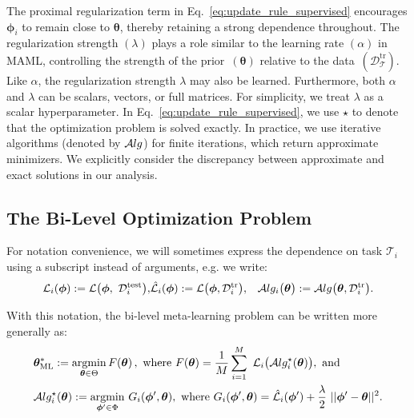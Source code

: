 \documentclass{article} \usepackage[nonatbib, final]{mod_neurips}
\newcommand{\task}{\mathcal{T}}
\newcommand{\data}{\mathcal{D}}
\DeclareMathOperator*{\argmin}{\mathrm{argmin}}
\newcommand{\param}{{\bm{\phi}}}               \newcommand{\paramspace}{\Phi}
\newcommand{\prior}{{\bm{\theta}}}               \newcommand{\priorspace}{\Theta}
\newcommand{\fn}{\mathcal{L}}                  \newcommand{\udfn}{\tilde{\fn}}        \newcommand{\fnht}{\hat{\fn}}        \newcommand{\ud}{\alg}
\newcommand{\algstar}{\mathcal{A}lg^\star}
\newcommand{\datatr}{\data^{\mathrm{tr}}}
\newcommand{\datatest}{\data^{\mathrm{test}}}\clearpage{}
\begin{document}
The proximal regularization term in Eq.~\ref{eq:update_rule_supervised} encourages $\param_i$ to remain close to $\prior$, thereby retaining a strong dependence throughout. The regularization strength $(\lambda)$ plays a role similar to the learning rate $(\alpha)$ in MAML, controlling the strength of the prior~$(\prior)$ relative to the data~$(\datatr_\task)$. Like $\alpha$, the regularization strength $\lambda$ may also be learned. Furthermore, both $\alpha$ and $\lambda$ can be scalars, vectors, or full matrices. For simplicity, we treat $\lambda$ as a scalar hyperparameter.
In Eq.~\ref{eq:update_rule_supervised}, we use $\star$ to denote that the optimization problem is solved exactly. In practice, we  use iterative algorithms (denoted by $\mathcal{A}lg$) for finite iterations, which return approximate minimizers. We explicitly consider the discrepancy between approximate and exact solutions in our analysis.

\vspace*{-0.1cm}
\subsection{The Bi-Level Optimization Problem} 
\vspace*{-0.1cm}

For notation convenience, we will sometimes express the dependence on
task $\task_i$ using a subscript instead of arguments, e.g.
we write:
\begin{eqnarray*}
  \fn_i(\param) := \fn \big(\param, \ \datatest_i \big), & 
  \fnht_i(\param) :=  \fn \big(\param, \datatr_i \big), &
\alg_i \big( \prior \big) :=  \alg \big( \prior, \datatr_i \big).
\end{eqnarray*}



With this notation, the bi-level meta-learning
problem can be written more generally as:   
\begin{equation}
\begin{aligned}
\label{eq:update_rule}
& \mlprior := \argmin_{\prior \in \priorspace} F(\prior) \, , 
\textrm{ where } F(\prior) 
= \frac{1}{M} \sum_{i=1}^M \ \fn_i \big( \algstar_i (\prior) \big), \text{ and} \\
& \algstar_i(\prior) := \underset{\dparam \in \paramspace}{\argmin} \ G_i(\dparam, \prior), \text{ where } G_i(\dparam, \prior) = \fnht_i(\dparam) + \frac{\lambda}{2}~||\dparam - \prior||^2.
\end{aligned}
\end{equation}
\end{document}

